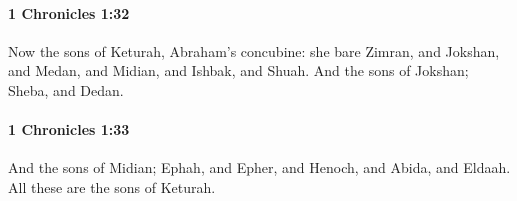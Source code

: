 		\paragraph{1 Chronicles 1:32} %
			\label{1CHRONICLES-1-32}

			Now the sons of Keturah, Abraham’s concubine: she bare Zimran, and Jokshan, and Medan, and Midian, and Ishbak, and Shuah. And the sons of Jokshan; Sheba, and Dedan.


		\paragraph{1 Chronicles 1:33} %
			\label{1CHRONICLES-1-33}

			And the sons of Midian; Ephah, and Epher, and Henoch, and Abida, and Eldaah. All these are the sons of Keturah.


